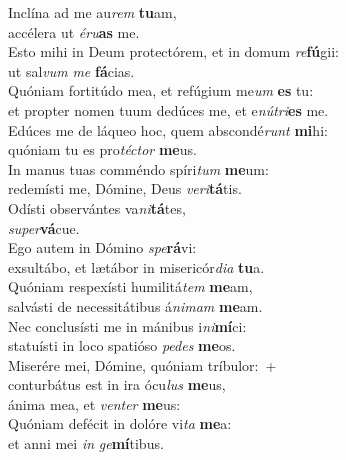 \evenverse Inclína ad me au\textit{rem} \textbf{tu}am,~\*\\
\evenverse accélera ut \textit{é}\textit{ru}\textbf{as} me.\\
\oddverse Esto mihi in Deum protectórem, et in domum \textit{re}\textbf{fú}gii:~\*\\
\oddverse ut sal\textit{vum} \textit{me} \textbf{fá}cias.\\
\evenverse Quóniam fortitúdo mea, et refúgium me\textit{um} \textbf{es} tu:~\*\\
\evenverse et propter nomen tuum dedúces me, et e\textit{nú}\textit{tri}\textbf{es} me.\\
\oddverse Edúces me de láqueo hoc, quem abscondé\textit{runt} \textbf{mi}hi:~\*\\
\oddverse quóniam tu es pro\textit{té}\textit{ctor} \textbf{me}us.\\
\evenverse In manus tuas comméndo spíri\textit{tum} \textbf{me}um:~\*\\
\evenverse redemísti me, Dómine, Deus \textit{ve}\textit{ri}\textbf{tá}tis.\\
\oddverse Odísti observántes va\textit{ni}\textbf{tá}tes,~\*\\
\oddverse \textit{su}\textit{per}\textbf{vá}cue.\\
\evenverse Ego autem in Dómino \textit{spe}\textbf{rá}vi:~\*\\
\evenverse exsultábo, et lætábor in misericór\textit{di}\textit{a} \textbf{tu}a.\\
\oddverse Quóniam respexísti humilitá\textit{tem} \textbf{me}am,~\*\\
\oddverse salvásti de necessitátibus á\textit{ni}\textit{mam} \textbf{me}am.\\
\evenverse Nec conclusísti me in mánibus i\textit{ni}\textbf{mí}ci:~\*\\
\evenverse statuísti in loco spatióso \textit{pe}\textit{des} \textbf{me}os.\\
\oddverse Miserére mei, Dómine, quóniam tríbulor:~+\\
\oddverse  conturbátus est in ira ócu\textit{lus} \textbf{me}us,~\*\\
\oddverse ánima mea, et \textit{ven}\textit{ter} \textbf{me}us:\\
\evenverse Quóniam defécit in dolóre vi\textit{ta} \textbf{me}a:~\*\\
\evenverse et anni mei \textit{in} \textit{ge}\textbf{mí}tibus.\\

